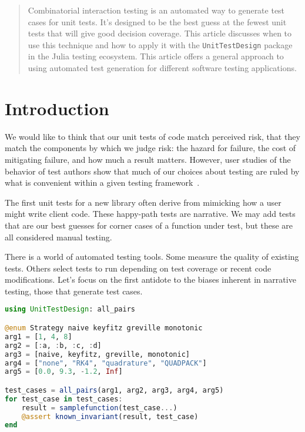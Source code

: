 \documentclass{juliacon}
\newcommand{\utd}{\texttt{UnitTestDesign}\xspace}
\begin{document}


\maketitle

\begin{abstract}
Combinatorial interaction testing is an automated way to generate test cases for unit tests. It's designed to be the best guess at the fewest unit tests that will give good decision coverage. This article discusses when to use this technique and how to apply it with the \utd package in the Julia testing ecosystem. This article offers a general approach to using automated test generation for different software testing applications.
\end{abstract}

\section{Introduction}

We would like to think that our unit tests of code match perceived risk, that they match the components by which we judge risk: the hazard for failure, the cost of mitigating failure, and how much a result matters. However, user studies of the behavior of test authors show that much of our choices about testing are ruled by what is convenient within a given testing framework~\cite{Wiklund2017-ms}.

\vskip 6pt
The first unit tests for a new library often derive from mimicking how a user might write client code. These happy-path tests are narrative. We may add tests that are our best guesses for corner cases of a function under test, but these are all considered manual testing.

\vskip 6pt
There is a world of automated testing tools. Some measure the quality of existing tests. Others select tests to run depending on test coverage or recent code modifications. Let's focus on the first antidote to the biases inherent in narrative testing, those that generate test cases.

\begin{lstlisting}[language=Julia]
using UnitTestDesign: all_pairs

@enum Strategy naive keyfitz greville monotonic
arg1 = [1, 4, 8]
arg2 = [:a, :b, :c, :d]
arg3 = [naive, keyfitz, greville, monotonic]
arg4 = ["none", "RK4", "quadrature", "QUADPACK"]
arg5 = [0.0, 9.3, -1.2, Inf]

test_cases = all_pairs(arg1, arg2, arg3, arg4, arg5)
for test_case in test_cases:
    result = samplefunction(test_case...)
    @assert known_invariant(result, test_case)
end
\end{lstlisting}
\end{document}
